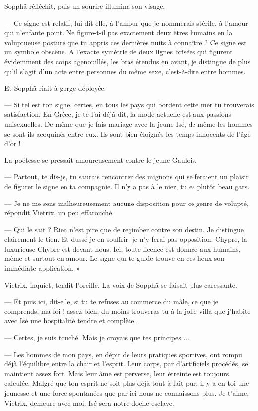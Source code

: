 \documentclass[a4paper, 11pt, oneside, polutonikogreek, french]{article}
\begin{document}
Sopphâ réfléchit, puis un sourire illumina son visage.

--- Ce signe est relatif, lui dit-elle, à l'amour que je nommerais stérile, à l'amour qui n'enfante point. Ne figure-t-il pas exactement deux êtres humains en la voluptueuse posture que tu appris ces dernières nuits à connaître ? Ce signe est un symbole obscène. A l'exacte symétrie de deux lignes brisées qui figurent évidemment des corps agenouillés, les bras étendus en avant, je distingue de plus qu'il s'agit d'un acte entre personnes du même sexe, c'est-à-dire entre hommes.

Et Sopphâ riait à gorge déployée.

--- Si tel est ton signe, certes, en tous les pays qui bordent cette mer tu trouverais satisfaction. En Grèce, je te l'ai déjà dit, la mode actuelle est aux passions unisexuelles. De même que je fais mariage avec la jeune Isé, de même les hommes se sont-ils acoquinés entre eux. Ils sont bien éloignés les temps innocents de l'âge d'or !

La poétesse se pressait amoureusement contre le jeune Gaulois.

--- Partout, te dis-je, tu saurais rencontrer des mignons qui se feraient un plaisir de figurer le signe en ta compagnie. Il n'y a pas à le nier, tu es plutôt beau gars.

--- Je ne me sens malheureusement aucune disposition pour ce genre de volupté, répondit Vietrix, un peu effarouché.

--- Qui le sait ? Rien n'est pire que de regimber contre son destin. Je distingue clairement le tien. Et dussé-je en souffrir, je n'y ferai pas opposition. Chypre, la luxurieuse Chypre est devant nous. Ici, toute licence est donnée aux humains, même et surtout en amour. Le signe qui te guide trouve en ces lieux son immédiate application. »

Vietrix, inquiet, tendit l'oreille. La voix de Sopphâ se faisait plus caressante.

--- Et puis ici, dit-elle, si tu te refuses au commerce du mâle, ce que je comprends, ma foi ! assez bien, du moins trouveras-tu à la jolie villa que j'habite avec Isé une hospitalité tendre et complète.

--- Certes, je suis touché. Mais je croyais que tes principes ...

--- Les hommes de mon pays, en dépit de leurs pratiques sportives, ont rompu déjà l'équilibre entre la chair et l'esprit. Leur corps, par d'artificiels procédés, se maintient assez fort. Mais leur âme est perverse, leur étreinte est toujours calculée. Malgré que ton esprit ne soit plus déjà tout à fait pur, il y a en toi une jeunesse et une force spontanées que par ici nous ne connaissons plus. Je t'aime, Vietrix, demeure avec moi. Isé sera notre docile esclave.
\end{document}
